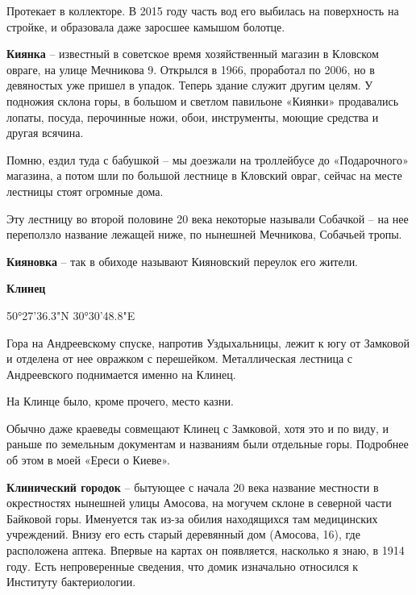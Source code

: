 Протекает в коллекторе. В 2015 году часть вод его выбилась на поверхность на стройке, и образовала даже заросшее камышом болотце.\\

\medskip

\textbf{Киянка} – известный в советское время хозяйственный магазин в Кловском овраге, на улице Мечникова 9. Открылся в 1966, проработал по 2006, но в девяностых уже пришел в упадок. Теперь здание служит другим целям. У подножия склона горы, в большом и светлом павильоне «Киянки» продавались лопаты, посуда, перочинные ножи, обои, инструменты, моющие средства и другая всячина.

Помню, ездил туда с бабушкой – мы доезжали на троллейбусе до «Подарочного» магазина, а потом шли по большой лестнице в Кловский овраг, сейчас на месте лестницы стоят огромные дома.

Эту лестницу во второй половине 20 века некоторые называли Собачкой – на нее переползло название лежащей ниже, по нынешней Мечникова, Собачьей тропы.\\

\medskip

\textbf{Кияновка} – так в обиходе называют Кияновский переулок его жители.\\

\medskip

\textbf{Клинец}

50°27'36.3"N 30°30'48.8"E

Гора на Андреевскому спуске, напротив Уздыхальницы, лежит к югу от Замковой и отделена от нее овражком с перешейком. Металлическая лестница с Андреевского поднимается именно на Клинец.

На Клинце было, кроме прочего, место казни.

Обычно даже краеведы совмещают Клинец с Замковой, хотя это и по виду, и раньше по земельным документам и названиям были отдельные горы. Подробнее об этом в моей «Ереси о Киеве».\\

\medskip

\textbf{Клинический городок} – бытующее с начала 20 века название местности в окрестностях нынешней улицы Амосова, на могучем склоне в северной части Байковой горы. Именуется так из-за обилия находящихся там медицинских учреждений. Внизу его есть старый деревянный дом (Амосова, 16), где расположена аптека. Впервые на картах он появляется, насколько я знаю, в 1914 году. Есть непроверенные сведения, что домик изначально относился к Институту бактериологии.

